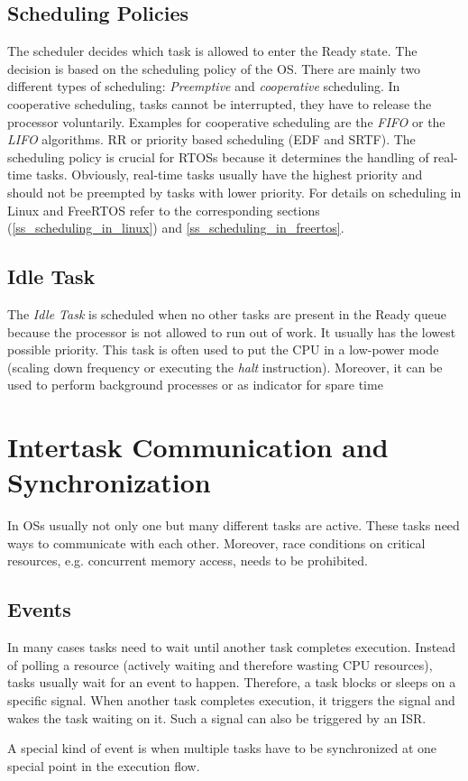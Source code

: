\subsection{Scheduling Policies}\label{ss_scheduling_policy} 
The scheduler decides which task is allowed to enter the Ready state. 
The decision is based on the scheduling policy of the \ac{OS}.
There are mainly two different types of scheduling: \textit{Preemptive} and \textit{cooperative} scheduling.
In cooperative scheduling, tasks cannot be interrupted, they have to release the processor voluntarily. 
Examples for cooperative scheduling are the \textit{\ac{FIFO}} or the \textit{\ac{LIFO}} algorithms.
\ac{RR} or priority based scheduling (\ac{EDF} and \ac{SRTF}).
The scheduling policy is crucial for \acp{RTOS} because it determines the handling of real-time tasks.
Obviously, real-time tasks usually have the highest priority and should not be preempted by tasks with lower priority.
For details on scheduling in Linux and FreeRTOS refer to the corresponding sections (\ref{ss_scheduling_in_linux}) and \ref{ss_scheduling_in_freertos}.

\subsection{Idle Task}
The \textit{Idle Task} is scheduled when no other tasks are present in the Ready queue because the processor is not allowed to run out of work.
It usually has the lowest possible priority.
This task is often used to put the \ac{CPU} in a low-power mode (scaling down frequency or executing the \textit{halt} instruction). 
Moreover, it can be used to perform background processes or as indicator for spare time  
 
\section{Intertask Communication and Synchronization}\label{s_intertask_communication}
In \acp{OS} usually not only one but many different tasks are active.
These tasks need ways to communicate with each other.
Moreover, race conditions on critical resources, e.g. concurrent memory access, needs to be prohibited.

\subsection{Events}
In many cases tasks need to wait until another task completes execution.
Instead of polling a resource (actively waiting and therefore wasting \ac{CPU} resources), tasks usually wait for an event to happen.
Therefore, a task blocks or sleeps on a specific signal.
When another task completes execution, it triggers the signal and wakes the task waiting on it.
Such a signal can also be triggered by an \ac{ISR}.
\par
A special kind of event is when multiple tasks have to be synchronized at one special point in the execution flow.


